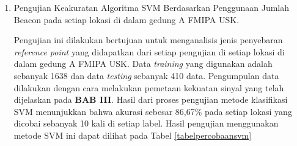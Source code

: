 \begin{enumerate}

	\item Pengujian Keakuratan  Algoritma SVM Berdasarkan Penggunaan Jumlah Beacon pada setiap lokasi di dalam gedung A FMIPA USK.

	      \par Pengujian ini dilakukan bertujuan untuk menganalisis jenis penyebaran \textit{reference point} yang didapatkan dari setiap pengujian di setiap lokasi di dalam gedung A FMIPA USK. Data \textit{training} yang digunakan adalah sebanyak 1638 dan data \textit{testing} sebanyak 410 data. Pengumpulan data dilakukan dengan cara melakukan pemetaan kekuatan sinyal yang telah dijelaskan pada \textbf{BAB III}. Hasil dari proses pengujian metode klasifikasi SVM menunjukkan bahwa akurasi sebesar 86,67\% pada setiap lokasi yang dicobai sebanyak 10 kali di setiap label. Hasil pengujian menggunakan metode SVM ini dapat dilihat pada Tabel \ref{tabelpercobaansvm}


\end{enumerate}
